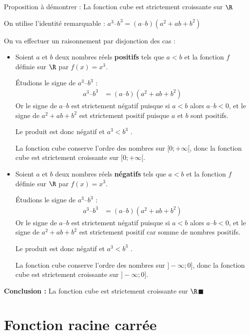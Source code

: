 \begin{dem}{}{}
Proposition à démontrer : \og La fonction cube est strictement croissante sur $\R$ \fg{} 

\medskip
\noindent On utilise l'identité remarquable : $a^3 – b^3 = (a – b)(a^2 + ab + b^2)$

\noindent On va effectuer un raisonnement par disjonction des cas : 

\begin{itemize}
\item  Soient $a$ et $b$ deux nombres réels \textbf{positifs} tels que $a<b$ et la fonction $f$ définie sur $\R$ par $f(x)=x^3$.

Étudions le signe de  $a^3 – b^3$ :
\begin{align*}
a^3 – b^3 &= (a – b)(a^2 + ab + b^2) 
\end{align*}
Or le signe de $a – b$  est strictement négatif puisque si $a < b$ alors $a – b < 0$, et le signe de  $a^2 + ab + b^2$ est strictement positif puisque $a$ et $b$ sont positifs.

\noindent Le produit est donc négatif et $a^3 < b^3$ . 

\medskip
\noindent La fonction cube conserve l'ordre des nombres sur $[0 ;+\infty[$, donc la fonction cube est strictement croissante sur $[0 ;+\infty[$.
\item  Soient $a$ et $b$ deux nombres réels \textbf{négatifs} tels que $a<b$ et la fonction $f$ définie sur $\R$ par $f(x)=x^3$.

Étudions le signe de  $a^3 – b^3$ :
\begin{align*}
a^3 – b^3 &= (a – b)(a^2 + ab + b^2) 
\end{align*}
\noindent Or le signe de $a – b$  est strictement négatif puisque si $a < b$ alors $a – b < 0$, et le signe de  $a^2 + ab + b^2$ est strictement positif car somme de nombres positifs.

\noindent Le produit est donc négatif et $a^3 < b^3$ . 

\medskip
\noindent La fonction cube conserve l'ordre des nombres sur $]-\infty;0]$, donc la fonction cube est strictement croissante sur $]-\infty;0]$.
\end{itemize}

\medskip
\textbf{Conclusion :} La fonction cube est strictement croissante sur $\R$\hfill $\blacksquare$
\end{dem}

\section{Fonction racine carrée}

